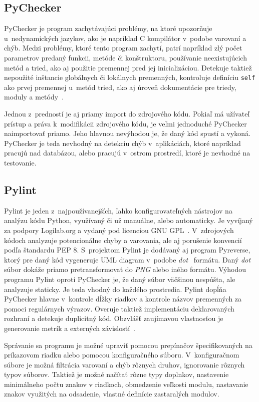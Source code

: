 \documentclass[11pt,oneside,final]{fithesis2}
\begin{document}
\subsection{PyChecker}

	PyChecker je program zachytávajúci problémy, na ktoré upozorňuje u~nedynamických jazykov, ako je napríklad C kompilátor v~podobe varovaní a chýb. Medzi problémy, ktoré tento program zachytí, patrí napríklad zlý počet parametrov predaný funkcii, metóde či konštruktoru, používanie neexistujúcich metód a tried, ako aj použitie premennej pred jej inicializáciou. Detekuje taktiež nepoužité inštancie globálnych či lokálnych premenných, kontroluje definíciu \texttt{self} ako prvej premennej u~metód tried, ako aj úroveň dokumentácie pre triedy, moduly a metódy~\cite{pychecker}. 
	
	Jednou z~predností je aj priamy import do zdrojového kódu. Pokiaľ má užívateľ prístup a práva k~modifikácii zdrojového kódu, je veľmi jednoduché PyChecker naimportovať priamo. Jeho hlavnou nevýhodou je, že daný kód spustí a vykoná. PyChecker je teda nevhodný na detekciu chýb v~aplikáciách, ktoré napríklad pracujú nad databázou, alebo pracujú v~ostrom prostredí, ktoré je nevhodné na testovanie.

\subsection{Pylint}
	Pylint je jeden z~najpoužívanejších, ľahko konfigurovateľných nástrojov na analýzu kódu Python, využívaný či už manuálne, alebo automaticky. Je vyvíjaný za podpory Logilab.org a vydaný pod licenciou GNU GPL~\cite{gnugpl}. V~zdrojových kódoch analyzuje potencionálne chyby a varovania, ale aj porušenie konvencií podľa štandardu PEP 8. S~projektom Pylint je dodávaný aj program Pyreverse, ktorý pre daný kód vygeneruje UML diagram v~podobe \textit{dot}~\cite{dotformat} formátu. Daný \textit{dot} súbor dokáže priamo pretransformovať do \textit{PNG} alebo iného formátu. Výhodou programu Pylint oproti PyChecker je, že daný súbor väčšinou nespúšta, ale analyzuje staticky. Je teda vhodný do každého prostredia. Pylint dopĺňa PyChecker hlavne v~kontrole dĺžky riadkov a kontrole názvov premenných za pomoci regulárnych výrazov. Overuje taktiež implementáciu deklarovaných rozhraní a detekuje duplicitný kód.
    Obzvlášť zaujímavou vlastnosťou je generovanie metrík a externých závislostí~\cite{pylint}.

	Správanie sa programu je možné upraviť pomocou prepínačov špecifikovaných na príkazovom riadku alebo pomocou konfiguračného súboru. V~konfiguračnom súbore je možná filtrácia varovaní a chýb rôznych druhov, ignorovanie rôznych typov súborov. Taktiež je možné načítať rôzne typy doplnkov, nastavenie minimálneho počtu znakov v riadkoch, obmedzenie veľkosti modulu, nastavanie znakov využitých na odsadenie, vlastné definície zastaralých modulov.
    
\end{document}
